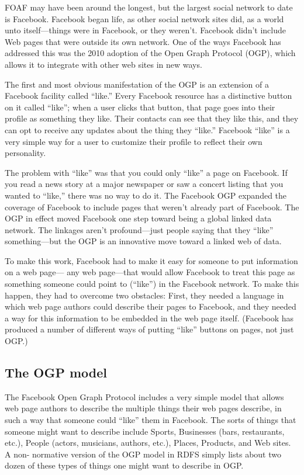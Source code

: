 FOAF may have been around the longest, but the largest social network to
date is Facebook. Facebook began life, as other social network sites
did, as a world unto itself---things were in Facebook, or they weren't.
Facebook didn't include Web pages that were outside its own network. One
of the ways Facebook has addressed this was the 2010 adoption of the
Open Graph Protocol (OGP), which allows it to integrate with other web
sites in new ways.

The first and most obvious manifestation of the OGP is an extension of a
Facebook facility called ``like.'' Every Facebook resource has a
distinctive button on it called ``like''; when a user clicks that
button, that page goes into their profile as something they like. Their
contacts can see that they like this, and they can opt to receive any
updates about the thing they ``like.'' Facebook ``like'' is a very
simple way for a user to customize their profile to reflect their own
personality.

The problem with ``like'' was that you could only ``like'' a page on
Facebook. If you read a news story at a major newspaper or saw a concert
listing that you wanted to ``like,'' there was no way to do it. The
Facebook OGP expanded the coverage of Facebook to include pages that
weren't already part of Facebook. The OGP in effect moved Facebook one
step toward being a global linked data network. The linkages aren't
profound---just people saying that they ``like'' something---but the OGP
is an innovative move toward a linked web of data.

To make this work, Facebook had to make it easy for someone to put
information on a web page--- any web page---that would allow Facebook to
treat this page as something someone could point to (``like'') in the
Facebook network. To make this happen, they had to overcome two
obstacles: First, they needed a language in which web page authors could
describe their pages to Facebook, and they needed a way for this
information to be embedded in the web page itself. (Facebook has
produced a number of different ways of putting ``like'' buttons on
pages, not just OGP.)

\subsection{The OGP model}

The Facebook Open Graph Protocol includes a very simple model that
allows web page authors to describe the multiple things their web pages
describe, in such a way that someone could ``like'' them in Facebook.
The sorts of things that someone might want to describe include Sports,
Businesses (bars, restaurants, etc.), People (actors, musicians,
authors, etc.), Places, Products, and Web sites. A non- normative
version of the OGP model in RDFS simply lists about two dozen of these
types of things one might want to describe in OGP.

